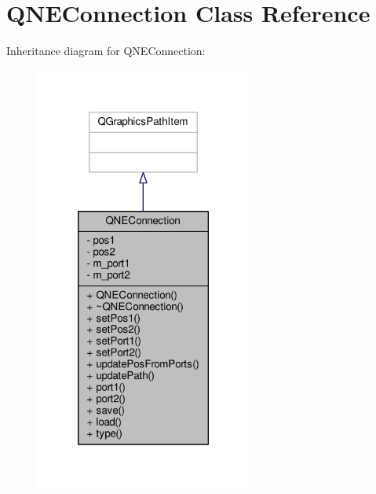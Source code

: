 \hypertarget{class_q_n_e_connection}{\section{Q\-N\-E\-Connection Class Reference}
\label{class_q_n_e_connection}
}


Inheritance diagram for Q\-N\-E\-Connection\-:
\nopagebreak
\begin{figure}[H]
\begin{center}
\leavevmode
\includegraphics[width=202pt]{class_q_n_e_connection__inherit__graph}
\end{center}
\end{figure}


